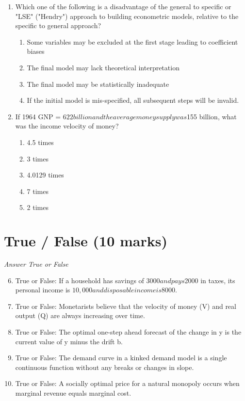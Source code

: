 \documentclass[12pt]{article}
\begin{document}
\begin{enumerate}[label=\arabic*.]
\begin{enumerate}[label=(\alph*)]
    \item no change in the market for fast-food workers.
\end{enumerate}
\item Which one of the following is a disadvantage of the general to specific or "LSE"
("Hendry") approach to building econometric models, relative to the specific to general
approach?
\begin{enumerate}[label=(\alph*)]
    \item Some variables may be excluded at the first stage leading to coefficient biases
    \item The final model may lack theoretical interpretation
    \item The final model may be statistically inadequate
    \item If the initial model is mis-specified, all subsequent steps will be invalid.
\end{enumerate}
\item If 1964 GNP = $622 billion and the average money supply was$155 billion, what was the
income velocity of money?
\begin{enumerate}[label=(\alph*)]
    \item 4.5 times
    \item 3 times
    \item 4.0129 times
    \item 7 times
    \item 2 times
\end{enumerate}
\end{enumerate}

\section*{True / False (10 marks)}
\textit{Answer True or False}
\begin{enumerate}[label=\arabic*.]
\setcounter{enumi}{5}
\item True or False: If a household has savings of $3000 and pays $2000 in taxes, its personal income is $10,000 and disposable income is $8000.
\item True or False: Monetarists believe that the velocity of money (V) and real output (Q) are always increasing over time.
\item True or False: The optimal one-step ahead forecast of the change in y is the current value of y minus the drift b.
\item True or False: The demand curve in a kinked demand model is a single continuous function without any breaks or changes in slope.
\item True or False: A socially optimal price for a natural monopoly occurs when marginal revenue equals marginal cost.
\end{enumerate}
\end{document}
